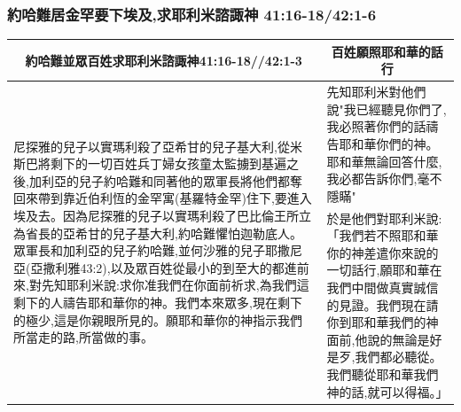\subsubsection{約哈難居金罕要下埃及,求耶利米諮諏神 41:16-18/42:1-6}


\begin{table}[H]
\centering
\begin{tabular}{p{10.5cm}|p{}}\hline\hline
\multicolumn{1}{c|}{約哈難並眾百姓求耶利米諮諏神41:16-18//42:1-3}&\multicolumn{1}{c}{百姓願照耶和華的話行}\\\hline
\multirow{2}{10.8cm}{尼探雅的兒子以實瑪利殺了亞希甘的兒子基大利,從米斯巴將剩下的一切百姓兵丁婦女孩童太監擄到基遍之後,加利亞的兒子約哈難和同著他的眾軍長將他們都奪回來帶到靠近伯利恆的金罕寓(基羅特金罕)住下,要進入埃及去。因為尼探雅的兒子以實瑪利殺了巴比倫王所立為省長的亞希甘的兒子基大利,約哈難懼怕迦勒底人。眾軍長和加利亞的兒子約哈難,並何沙雅的兒子耶撒尼亞(亞撒利雅43:2),以及眾百姓從最小的到至大的都進前來,對先知耶利米說:求你准我們在你面前祈求,為我們這剩下的人禱告耶和華你的神。我們本來眾多,現在剩下的極少,這是你親眼所見的。願耶和華你的神指示我們所當走的路,所當做的事。}
&先知耶利米對他們說"我已經聽見你們了,我必照著你們的話禱告耶和華你們的神。耶和華無論回答什麼,我必都告訴你們,毫不隱瞞"\\\cline{2-2}
&於是他們對耶利米說:「我們若不照耶和華你的神差遣你來說的一切話行,願耶和華在我們中間做真實誠信的見證。我們現在請你到耶和華我們的神面前,他說的無論是好是歹,我們都必聽從。我們聽從耶和華我們神的話,就可以得福。」\\\hline
\end{tabular}
\end{table} 



